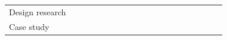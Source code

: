 \documentclass[english, 12pt, a4paper, sci, utf8, a-1b, online]{aaltothesis}
\begin{document}
{\begin{center}
\begin{longtable}{p{0.3\linewidth}p{0.6\linewidth}}
      Design research                              & \textcite{henriques2018improving} \newline \textcite{pinter2019polymorph} \newline \textcite{dong2019impact} \newline \textcite{oran2017set}                                                                                                                                                                                                                                                                                                                                                                                                                                                                                                                                                                                                                                                                                                                                                                                                       \\
      Case study                                   & \textcite{how-developers-experience-team-performance} \newline \textcite{paw}                                                                                                                                                                                                                                                                                                                                                                                                                                                                                                                                                                                                                                                                                                                                                                                                                                                                      \\

\end{longtable}
\end{center}}
\end{document}
